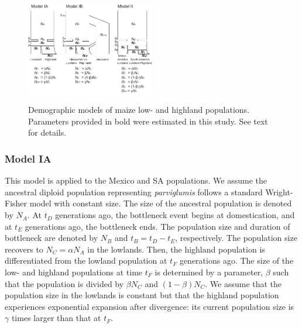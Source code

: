 \begin{figure}[tb]   
  \begin{center}
   \vspace{-0mm}
   \includegraphics[width=0.5\textwidth]{fig/Fig3}
   \renewcommand{\baselinestretch}{0.9}
   \vspace{-3mm}
   \caption{ Demographic models of maize low- and highland populations.  Parameters provided in bold were estimated in this study.  See text for details.
   }
\vspace{-6mm}
    \label{model}
  \end{center}
\end{figure}

%
%

\subsubsection{Model IA}
This model is applied to the Mexico and SA populations.
We assume the ancestral diploid population representing \emph{parviglumis} follows a standard Wright-Fisher model with constant size.  The size of the ancestral population is denoted by $N_A$.
At $t_D$ generations ago, the bottleneck event begins at domestication, and at $t_E$ generations ago, the bottleneck ends.  The population size and duration of bottleneck are denoted by $N_B$ and $t_B=t_D-t_E$, respectively.  The population size recovers to $N_C=\alpha N_A$ in the lowlands.  
Then, the highland population is differentiated from the lowland population at $t_F$ generations ago.  The size of the low- and highland populations at time $t_F$ is determined by a parameter, $\beta$ such that the population is divided by $\beta N_C$ and $(1-\beta)N_C$.  
We assume that the population size in the lowlands is constant but that the highland population experiences exponential expansion after divergence: its current population size is $\gamma$ times larger than that at $t_F$.  \\

